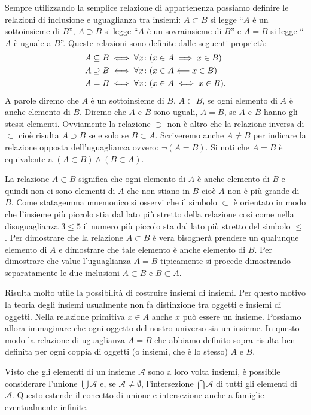 Sempre utilizzando la semplice relazione di appartenenza possiamo definire
le relazioni di inclusione e uguaglianza tra insiemi:
$A \subset B$ si legge ``$A$ è un sottoinsieme di $B$'',
$A \supset B$ si legge ``$A$ è un sovrainsieme di $B$''
e $A=B$ si legge ``$A$ è uguale a $B$''. 
Queste relazioni sono definite dalle seguenti proprietà:
\begin{align*}
  A \subseteq B &\iff \forall x\colon (x\in A \implies x\in B)\\
  A \supseteq B &\iff \forall x\colon (x\in A \Longleftarrow x\in B)\\
  A = B &\iff \forall x\colon (x\in A \iff x \in B).
\end{align*}
A parole diremo che $A$ è un sottoinsieme di $B$, 
$A \subset B$, se ogni elemento di $A$ è anche elemento di $B$.
Diremo che $A$ e $B$ sono uguali, $A=B$, 
se $A$ e $B$ hanno gli stessi elementi.
Ovviamente la relazione $\supset$ non è altro 
che la relazione inversa di $\subset$ cioè risulta 
$A\supset B$ se e solo se $B\subset A$.
Scriveremo anche $A \neq B$ per indicare
la relazione opposta dell'uguaglianza ovvero: $\lnot(A=B)$.
Si noti che $A=B$ è equivalente a $(A\subset B) \land (B\subset A)$.

La relazione $A \subset B$ significa che ogni elemento di $A$ 
è anche elemento di $B$ e quindi non ci sono elementi di $A$ che non stiano 
in $B$ cioè $A$ non è più grande di $B$. 
Come statagemma mnemonico si osservi che il simbolo 
$\subset$ è orientato in modo che l'insieme più piccolo 
stia dal lato più stretto della relazione così come 
nella disuguaglianza $3 \le 5$ il numero più piccolo 
sta dal lato più stretto del simbolo $\le$.
Per dimostrare che la relazione $A \subset B$ è vera 
bisognerà prendere un qualunque elemento di $A$ e dimostrare 
che tale elemento è anche elemento di $B$.
Per dimostrare che value l'uguaglianza $A=B$ tipicamente si procede 
dimostrando separatamente le due inclusioni $A\subset B$ e $B\subset A$.

Risulta molto utile la possibilità di costruire insiemi di insiemi.
Per questo motivo la teoria degli insiemi usualmente non fa distinzione
tra oggetti e insiemi di oggetti. Nella relazione primitiva $x\in A$ anche
$x$ può essere un insieme. Possiamo allora immaginare che ogni oggetto del
nostro universo sia un insieme. In questo modo la relazione di uguaglianza $A=B$
che abbiamo definito sopra risulta ben definita per ogni coppia di oggetti
(o insiemi, che è lo stesso) $A$ e $B$.

Visto che gli elementi di un insieme $\mathcal A$ sono a loro volta insiemi,
è possibile considerare l'unione $\bigcup \mathcal A$
e, se 
$\mathcal A \neq \emptyset$, l'intersezione $\bigcap \mathcal A$ di tutti gli elementi
di $\mathcal A$.
Questo estende il concetto di unione e intersezione anche a famiglie
eventualmente infinite.

